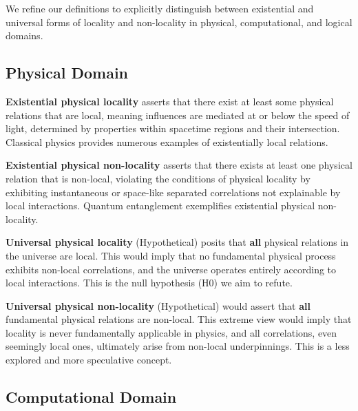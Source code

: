 	We refine our definitions to explicitly distinguish between existential and universal forms of locality and non-locality in physical, computational, and logical domains.

	\subsection{Physical Domain}

	\begin{definition}
		\textbf{Existential physical locality} asserts that there exist at least some physical relations that are local, meaning influences are mediated at or below the speed of light, determined by properties within spacetime regions and their intersection.  Classical physics provides numerous examples of existentially local relations.
	\end{definition}

	\begin{definition}
		\textbf{Existential physical non-locality} asserts that there exists at least one physical relation that is non-local, violating the conditions of physical locality by exhibiting instantaneous or space-like separated correlations not explainable by local interactions. Quantum entanglement exemplifies existential physical non-locality.
	\end{definition}

	\begin{definition}
		\textbf{Universal physical locality} (Hypothetical) posits that \textbf{all} physical relations in the universe are local. This would imply that no fundamental physical process exhibits non-local correlations, and the universe operates entirely according to local interactions. This is the null hypothesis (H0) we aim to refute.
	\end{definition}

	\begin{definition}
		\textbf{Universal physical non-locality} (Hypothetical) would assert that \textbf{all} fundamental physical relations are non-local. This extreme view would imply that locality is never fundamentally applicable in physics, and all correlations, even seemingly local ones, ultimately arise from non-local underpinnings.  This is a less explored and more speculative concept.
	\end{definition}
	
	\subsection{Computational Domain}
	
